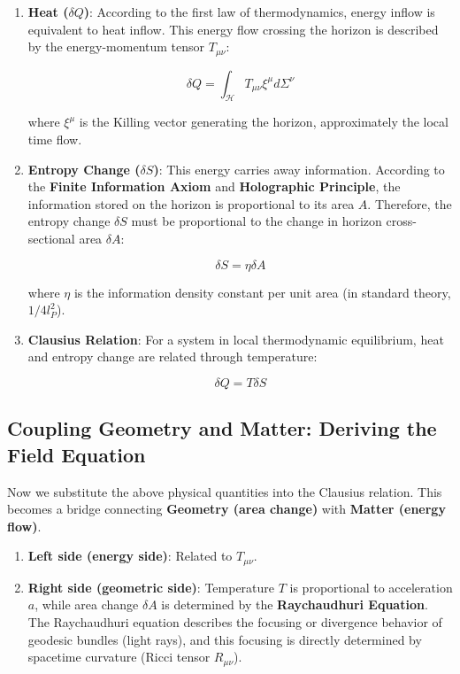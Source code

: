 \begin{enumerate}
\item \textbf{Heat ($\delta Q$)}: According to the first law of thermodynamics, energy inflow is equivalent to heat inflow. This energy flow crossing the horizon is described by the energy-momentum tensor $T_{\mu\nu}$:

    \begin{equation}
    \delta Q = \int_{\mathcal{H}} T_{\mu\nu} \xi^{\mu} d\Sigma^{\nu}
    \end{equation}

    where $\xi^{\mu}$ is the Killing vector generating the horizon, approximately the local time flow.

\item \textbf{Entropy Change ($\delta S$)}: This energy carries away information. According to the \textbf{Finite Information Axiom} and \textbf{Holographic Principle}, the information stored on the horizon is proportional to its area $A$. Therefore, the entropy change $\delta S$ must be proportional to the change in horizon cross-sectional area $\delta A$:

    \begin{equation}
    \delta S = \eta \delta A
    \end{equation}

    where $\eta$ is the information density constant per unit area (in standard theory, $1/4l_P^2$).

\item \textbf{Clausius Relation}: For a system in local thermodynamic equilibrium, heat and entropy change are related through temperature:

    \begin{equation}
    \delta Q = T \delta S
    \end{equation}
\end{enumerate}

\subsection{Coupling Geometry and Matter: Deriving the Field Equation}

Now we substitute the above physical quantities into the Clausius relation. This becomes a bridge connecting \textbf{Geometry (area change)} with \textbf{Matter (energy flow)}.

\begin{enumerate}
\item \textbf{Left side (energy side)}: Related to $T_{\mu\nu}$.

\item \textbf{Right side (geometric side)}: Temperature $T$ is proportional to acceleration $a$, while area change $\delta A$ is determined by the \textbf{Raychaudhuri Equation}. The Raychaudhuri equation describes the focusing or divergence behavior of geodesic bundles (light rays), and this focusing is directly determined by spacetime curvature (Ricci tensor $R_{\mu\nu}$).
\end{enumerate}

